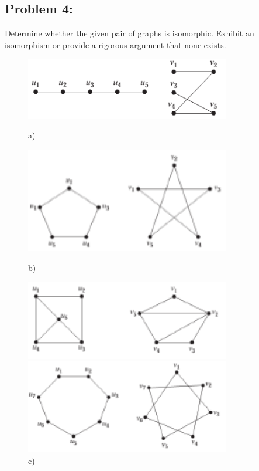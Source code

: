 \documentclass[12pt,en,a4paper]{article}
\begin{document}
	\subsection*{Problem 4:}
	Determine whether the given pair of graphs is isomorphic. Exhibit an isomorphism or provide a rigorous argument that none exists.
	\begin{figure}[ht]
		\begin{minipage}{0.5\textwidth}
			\includegraphics[width=0.8\textwidth]{gprob4_1.png}
			\caption*{a)}
			\label{fig:gprob4_1}
		\end{minipage}
		\begin{minipage}{0.5\textwidth}
			\includegraphics[width=0.8\textwidth]{gprob4_2.png}
			\caption*{b)}
			\label{fig:gprob4_2}
		\end{minipage}
		\begin{minipage}{0.5\textwidth}
			\includegraphics[width=0.8\textwidth]{gprob4_3.png}
			\caption*{c)}
			\label{fig:gprob4_3}
		\end{minipage}
		\begin{minipage}{0.5\textwidth}
			\includegraphics[width=0.8\textwidth]{gprob4_4.png}

\end{minipage}
\end{figure}
\end{document}
